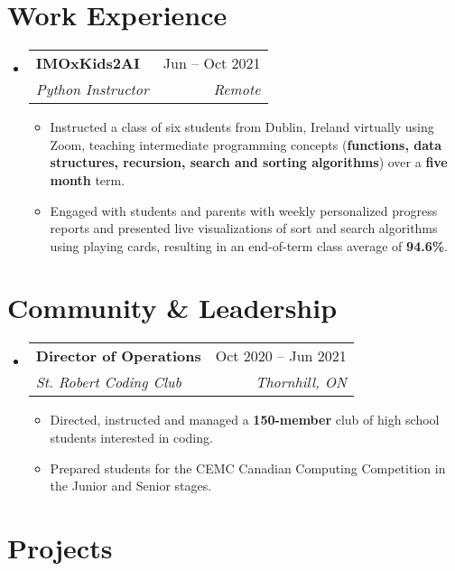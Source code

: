 \documentclass[letterpaper,11pt]{article}
\makeatletter
\newcommand{\resumeItem}[1]{
  \item\small{
    {#1 \vspace{-2pt}}
  }
}
\newcommand{\resumeSubheading}[4]{
  \vspace{-2pt}\item
    \begin{tabular*}{0.97\textwidth}[t]{l@{\extracolsep{\fill}}r}
      \textbf{#1} & #2 \\
      \textit{\small#3} & \textit{\small #4} \\
    \end{tabular*}\vspace{-7pt}
}
\newcommand{\resumeSubHeadingListStart}{\begin{itemize}[leftmargin=0.15in, label={}]}
\newcommand{\resumeSubHeadingListEnd}{\end{itemize}}
\newcommand{\resumeItemListStart}{\begin{itemize}}
\newcommand{\resumeItemListEnd}{\end{itemize}\vspace{-5pt}}
\makeatother
\begin{document}
\section{Work Experience}
  \resumeSubHeadingListStart

    \resumeSubheading
      {IMOxKids2AI}{Jun – Oct 2021}
      {Python Instructor}{Remote}
      \resumeItemListStart
        \resumeItem{Instructed a class of six students from Dublin, Ireland virtually using Zoom, teaching intermediate programming concepts (\textbf{functions, data structures, recursion, search and sorting algorithms}) over a \textbf{five month} term.}
        \resumeItem{Engaged with students and parents with weekly personalized progress reports and presented live visualizations of sort and search algorithms using playing cards, resulting in an end-of-term class average of \textbf{94.6\%}.}
      \resumeItemListEnd
     
    \resumeSubHeadingListEnd

\section{Community \& Leadership}
  \resumeSubHeadingListStart

    \resumeSubheading
      {Director of Operations}{Oct 2020 – Jun 2021}
      {St. Robert Coding Club}{Thornhill, ON}
      \resumeItemListStart
        \resumeItem{Directed, instructed and managed a \textbf{150-member} club of high school students interested in coding.}
        \resumeItem{Prepared students for the CEMC Canadian Computing Competition in the Junior and Senior stages.}
      \resumeItemListEnd

    \resumeSubHeadingListEnd

\section{Projects}
\end{document}
